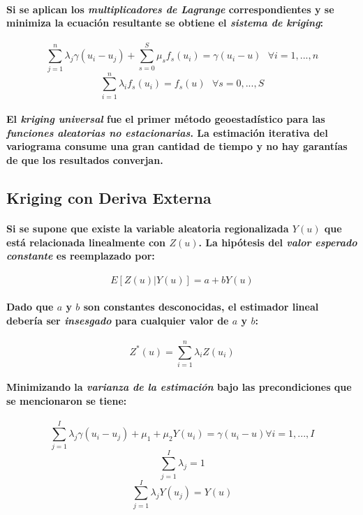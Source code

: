 \paragraph{
Si se aplican los \emph{multiplicadores de Lagrange} correspondientes y se minimiza la ecuación resultante se obtiene el \emph{sistema de kriging}:
}
\begin{equation}
\sum_{j=1}^n \lambda_j \gamma(u_i - u_j) + \sum_{s=0}^S \mu_s f_s(u_i) = \gamma(u_i - u) \textit{ } \forall i = 1,...,n
\end{equation}
\begin{equation}
\sum_{i=1}^n \lambda_i f_s(u_i) = f_s(u) \textit{ } \forall s = 0,...,S
\end{equation}
\paragraph{
El \emph{kriging universal} fue el primer método geoestadístico para las \emph{funciones aleatorias no estacionarias}. La estimación iterativa del variograma consume una gran cantidad de tiempo y no hay garantías de que los resultados converjan.
}


\subsection{Kriging con Deriva Externa}
\paragraph{
Si se supone que existe la variable aleatoria regionalizada $Y(u)$ que está relacionada linealmente con $Z(u)$. La hipótesis del \emph{valor esperado constante} es reemplazado por:
}
\begin{equation}
E[Z(u)|Y(u)] = a + b Y(u)
\end{equation}
\paragraph{
Dado que $a$ y $b$ son constantes desconocidas, el estimador lineal debería ser \emph{insesgado} para cualquier valor de $a$ y $b$:
}
\begin{equation}
Z^*(u) = \sum_{i=1}^n \lambda_i Z(u_i)
\end{equation}
\paragraph{
Minimizando la \emph{varianza de la estimación} bajo las precondiciones que se mencionaron se tiene:
}
\begin{equation}
\sum_{j=1}^I \lambda_j \gamma(u_i - u_j) + \mu_1 + \mu_2 Y(u_i) = \gamma(u_i - u) \forall i = 1,...,I
\end{equation}
\begin{equation}
\sum_{j=1}^I \lambda_j = 1
\end{equation}
\begin{equation}
\sum_{j=1}^I \lambda_j Y(u_j) = Y(u)
\end{equation}

